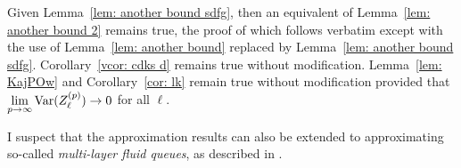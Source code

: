 Given Lemma~\ref{lem: another bound sdfg}, then an equivalent of Lemma~\ref{lem: another bound 2} remains true, the proof of which follows verbatim except with the use of Lemma~\ref{lem: another bound} replaced by Lemma~\ref{lem: another bound sdfg}. Corollary~\ref{vcor: cdks d} remains true without modification. Lemma~\ref{lem: KajPOw} and Corollary~\ref{cor: lk} remain true without modification provided that \(\lim\limits_{p\to\infty}\mathrm{Var}(Z_\ell^{(p)})\to 0\) for all \(\ell\). 

\begin{rem}
	I suspect that the approximation results can also be extended to approximating so-called \emph{multi-layer fluid queues}, as described in \cite{bo2008}. 
\end{rem}































